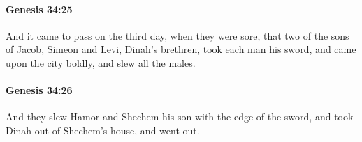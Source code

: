 		\paragraph{Genesis 34:25} %
			\label{GENESIS-34-25}

			And it came to pass on the third day, when they were sore, that two of the sons of Jacob, Simeon and Levi, Dinah's brethren, took each man his sword, and came upon the city boldly, and slew all the males.


		\paragraph{Genesis 34:26} %
			\label{GENESIS-34-26}

			And they slew Hamor and Shechem his son with the edge of the sword, and took Dinah out of Shechem's house, and went out.


